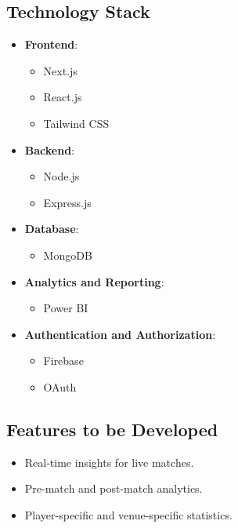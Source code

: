 \subsection{Technology Stack}
\begin{itemize}
    \item \textbf{Frontend}:
    \begin{itemize}
        \item Next.js
        \item React.js
        \item Tailwind CSS
    \end{itemize}
    \item \textbf{Backend}:
    \begin{itemize}
        \item Node.js
        \item Express.js
    \end{itemize}
    \item \textbf{Database}:
    \begin{itemize}
        \item MongoDB
    \end{itemize}
    \item \textbf{Analytics and Reporting}:
    \begin{itemize}
        \item Power BI
    \end{itemize}
    \item \textbf{Authentication and Authorization}:
    \begin{itemize}
        \item Firebase
        \item OAuth
    \end{itemize}
\end{itemize}

\subsection{Features to be Developed}
\begin{itemize}
    \item Real-time insights for live matches.
    \item Pre-match and post-match analytics.
    \item Player-specific and venue-specific statistics.
\end{itemize}

